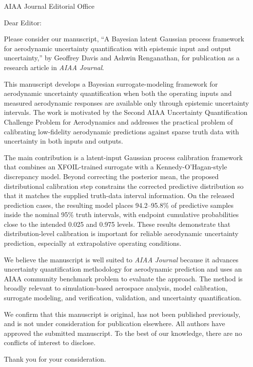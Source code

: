 \documentclass[11pt]{letter}
\begin{document}
\begin{letter}{AIAA Journal Editorial Office}

\opening{Dear Editor:}

Please consider our manuscript, ``A Bayesian latent Gaussian process framework for aerodynamic uncertainty quantification with epistemic input and output uncertainty,'' by Geoffrey Davis and Ashwin Renganathan, for publication as a research article in \emph{AIAA Journal}.

This manuscript develops a Bayesian surrogate-modeling framework for aerodynamic uncertainty quantification when both the operating inputs and measured aerodynamic responses are available only through epistemic uncertainty intervals. The work is motivated by the Second AIAA Uncertainty Quantification Challenge Problem for Aerodynamics and addresses the practical problem of calibrating low-fidelity aerodynamic predictions against sparse truth data with uncertainty in both inputs and outputs.

The main contribution is a latent-input Gaussian process calibration framework that combines an XFOIL-trained surrogate with a Kennedy-O'Hagan-style discrepancy model. Beyond correcting the posterior mean, the proposed distributional calibration step constrains the corrected predictive distribution so that it matches the supplied truth-data interval information. On the released prediction cases, the resulting model places 94.2--95.8\% of predictive samples inside the nominal 95\% truth intervals, with endpoint cumulative probabilities close to the intended 0.025 and 0.975 levels. These results demonstrate that distribution-level calibration is important for reliable aerodynamic uncertainty prediction, especially at extrapolative operating conditions.

We believe the manuscript is well suited to \emph{AIAA Journal} because it advances uncertainty quantification methodology for aerodynamic prediction and uses an AIAA community benchmark problem to evaluate the approach. The method is broadly relevant to simulation-based aerospace analysis, model calibration, surrogate modeling, and verification, validation, and uncertainty quantification.

We confirm that this manuscript is original, has not been published previously, and is not under consideration for publication elsewhere. All authors have approved the submitted manuscript. To the best of our knowledge, there are no conflicts of interest to disclose.

\closing{Thank you for your consideration.}

\end{letter}
\end{document}
